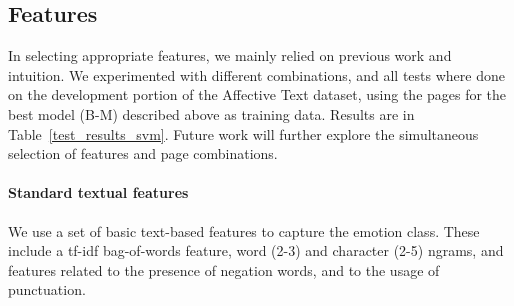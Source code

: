 \documentclass[11pt]{article}
\begin{document}
\subsection{Features}
In selecting appropriate features, we mainly relied on previous work and intuition. We experimented with different combinations, and all tests where done on the development portion of the Affective Text dataset, using the pages for the best model (B-M) described above as training data. %
Results are in Table~\ref{test_results_svm}.
Future work will further explore the simultaneous selection of features and page combinations.




\paragraph{Standard textual features} We use a set of basic text-based features to capture the emotion class. These include a tf-idf bag-of-words feature, word (2-3) and character (2-5) ngrams, and features related to the presence of negation words, and to the usage of punctuation.


%
\end{document}
